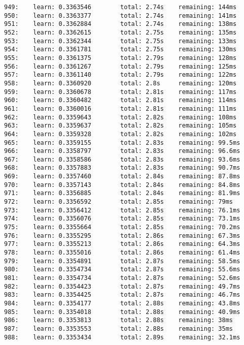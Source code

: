 \documentclass[11pt]{article}
\begin{document}
\begin{Verbatim}[commandchars=\\\{\}]
949:    learn: 0.3363546        total: 2.74s    remaining: 144ms
950:    learn: 0.3363377        total: 2.74s    remaining: 141ms
951:    learn: 0.3362884        total: 2.74s    remaining: 138ms
952:    learn: 0.3362615        total: 2.75s    remaining: 135ms
953:    learn: 0.3362344        total: 2.75s    remaining: 133ms
954:    learn: 0.3361781        total: 2.75s    remaining: 130ms
955:    learn: 0.3361375        total: 2.79s    remaining: 128ms
956:    learn: 0.3361267        total: 2.79s    remaining: 125ms
957:    learn: 0.3361140        total: 2.79s    remaining: 122ms
958:    learn: 0.3360920        total: 2.8s     remaining: 120ms
959:    learn: 0.3360678        total: 2.81s    remaining: 117ms
960:    learn: 0.3360482        total: 2.81s    remaining: 114ms
961:    learn: 0.3360016        total: 2.81s    remaining: 111ms
962:    learn: 0.3359643        total: 2.82s    remaining: 108ms
963:    learn: 0.3359637        total: 2.82s    remaining: 105ms
964:    learn: 0.3359328        total: 2.82s    remaining: 102ms
965:    learn: 0.3359155        total: 2.83s    remaining: 99.5ms
966:    learn: 0.3358797        total: 2.83s    remaining: 96.6ms
967:    learn: 0.3358586        total: 2.83s    remaining: 93.6ms
968:    learn: 0.3357883        total: 2.83s    remaining: 90.7ms
969:    learn: 0.3357460        total: 2.84s    remaining: 87.8ms
970:    learn: 0.3357143        total: 2.84s    remaining: 84.8ms
971:    learn: 0.3356885        total: 2.84s    remaining: 81.9ms
972:    learn: 0.3356592        total: 2.85s    remaining: 79ms
973:    learn: 0.3356412        total: 2.85s    remaining: 76.1ms
974:    learn: 0.3356076        total: 2.85s    remaining: 73.1ms
975:    learn: 0.3355664        total: 2.85s    remaining: 70.2ms
976:    learn: 0.3355295        total: 2.86s    remaining: 67.3ms
977:    learn: 0.3355213        total: 2.86s    remaining: 64.3ms
978:    learn: 0.3355016        total: 2.86s    remaining: 61.4ms
979:    learn: 0.3354891        total: 2.87s    remaining: 58.5ms
980:    learn: 0.3354734        total: 2.87s    remaining: 55.6ms
981:    learn: 0.3354734        total: 2.87s    remaining: 52.6ms
982:    learn: 0.3354423        total: 2.87s    remaining: 49.7ms
983:    learn: 0.3354425        total: 2.87s    remaining: 46.7ms
984:    learn: 0.3354177        total: 2.88s    remaining: 43.8ms
985:    learn: 0.3354018        total: 2.88s    remaining: 40.9ms
986:    learn: 0.3353813        total: 2.88s    remaining: 38ms
987:    learn: 0.3353553        total: 2.88s    remaining: 35ms
988:    learn: 0.3353434        total: 2.89s    remaining: 32.1ms

\end{Verbatim}
\end{document}
